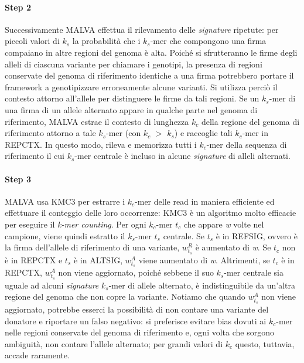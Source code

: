 \documentclass[../main.tex]{subfiles}
\begin{document}
\paragraph{Step 2} Successivamente MALVA effettua il rilevamento delle \textit{signature} ripetute: per piccoli valori di  \textit{${k}_{s}$} la probabilità che i  \textit{${k}_{s}$}-mer che compongono una firma compaiano in altre regioni del genoma è alta. Poiché si sfrutteranno le firme degli alleli di ciascuna variante per chiamare i genotipi, la presenza di regioni conservate del genoma di riferimento identiche a una firma potrebbero portare il framework a genotipizzare erroneamente alcune varianti. Si utilizza perciò il contesto attorno all'allele per distinguere le firme da tali regioni. Se un  \textit{${k}_{s}$}-mer di una firma di un allele alternato appare in qualche parte nel genoma di riferimento, MALVA estrae il contesto di lunghezza  \textit{${k}_{c}$} della regione del genoma di riferimento attorno a tale \textit{${k}_{s}$}-mer (con  \textit{${k}_{c}$} $>$ \textit{${k}_{s}$}) e raccoglie tali \textit{${k}_{c}$}-mer in REPCTX. In questo modo, rileva e memorizza tutti i \textit{${k}_{c}$}-mer della sequenza di riferimento il cui \textit{${k}_{s}$}-mer centrale è incluso in alcune \textit{signature} di alleli alternati. 

\paragraph{Step 3} MALVA usa KMC3 \cite{Kokot2017KMC3} per estrarre i \textit{${k}_{c}$}-mer delle read in maniera efficiente ed effettuare il conteggio delle loro occorrenze: KMC3 è un algoritmo molto efficacie per eseguire il \textit{k-mer counting}. Per ogni \textit{${k}_{c}$}-mer  \textit{${t}_{c}$} che appare \textit{w} volte nel campione, viene quindi estratto il \textit{${k}_{s}$}-mer  \textit{${t}_{s}$} centrale. Se \textit{${t}_{s}$} è in REFSIG, ovvero è la firma dell'allele di riferimento di una variante, \textit{$w_{{t}_{s}}^{R}$} è aumentato di \textit{w}. Se \textit{${t}_{c}$} non è in REPCTX e \textit{${t}_{s}$} è in ALTSIG, \textit{$w_{{t}_{s}}^{A}$} viene aumentato di \textit{w}. Altrimenti, se \textit{${t}_{c}$} è in REPCTX, \textit{$w_{{t}_{s}}^{A}$} non viene aggiornato, poiché sebbene il suo \textit{${k}_{s}$}-mer centrale sia uguale ad alcuni \textit{signature} \textit{${k}_{s}$}-mer di allele alternato, è indistinguibile da un'altra regione del genoma che non copre la variante. Notiamo che quando \textit{$w_{{t}_{s}}^{A}$} non viene aggiornato, potrebbe esserci la possibilità di non contare una variante del donatore e riportare un falso negativo: si preferisce evitare bias dovuti ai \textit{${k}_{c}$}-mer nelle regioni conservate del genoma di riferimento e, ogni volta che sorgono ambiguità, non contare l'allele alternato; per grandi valori di  \textit{${k}_{c}$} questo, tuttavia, accade raramente. 
\end{document}
